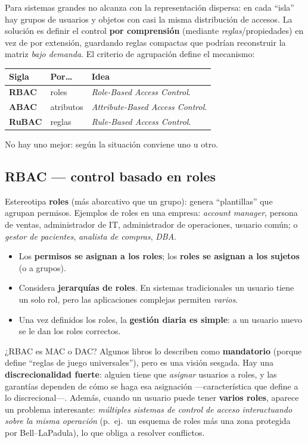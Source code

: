 \documentclass[11pt,a4paper]{article}
\begin{document}
Para sistemas grandes no alcanza con la representación dispersa: en cada ``isla'' hay grupos
de usuarios y objetos con casi la misma distribución de accesos. La solución es definir el
control \textbf{por comprensión} (mediante \emph{reglas}/propiedades) en vez de por extensión,
guardando reglas compactas que podrían reconstruir la matriz \emph{bajo demanda}. El criterio
de agrupación define el mecanismo:

\begin{center}
\renewcommand{\arraystretch}{1.3}
\begin{tabular}{>{\bfseries}p{2.6cm} p{2.8cm} p{7.4cm}}
\toprule
Sigla & Por\dots & Idea \\
\midrule
RBAC & roles & \emph{Role-Based Access Control}.\\
ABAC & atributos & \emph{Attribute-Based Access Control}.\\
RuBAC & reglas & \emph{Rule-Based Access Control}.\\
\bottomrule
\end{tabular}
\end{center}

\noindent No hay uno mejor: según la situación conviene uno u otro.

\subsection{RBAC — control basado en roles}
Estereotipa \textbf{roles} (más abarcativo que un grupo): genera ``plantillas'' que agrupan
permisos. Ejemplos de roles en una empresa: \emph{account manager}, persona de ventas,
administrador de IT, administrador de operaciones, usuario común; o
\emph{gestor de pacientes}, \emph{analista de compras}, \emph{DBA}.
\begin{itemize}[leftmargin=1.4em,itemsep=1pt]
  \item Los \textbf{permisos se asignan a los roles}; los \textbf{roles se asignan a los
        sujetos} (o a grupos).
  \item Considera \textbf{jerarquías de roles}. En sistemas tradicionales un usuario tiene un
        solo rol, pero las aplicaciones complejas permiten \emph{varios}.
  \item Una vez definidos los roles, la \textbf{gestión diaria es simple}: a un usuario nuevo
        se le dan los roles correctos.
\end{itemize}

\begin{anecbox}{¿RBAC es MAC o DAC?}
Algunos libros lo describen como \textbf{mandatorio} (porque define ``reglas de juego
universales''), pero es una visión sesgada. Hay una \textbf{discrecionalidad fuerte}: alguien
tiene que \emph{asignar} usuarios a roles, y las garantías dependen de cómo se haga esa
asignación —característica que define a lo discrecional—. Además, cuando un usuario puede tener
\textbf{varios roles}, aparece un problema interesante: \emph{múltiples sistemas de control de
acceso interactuando sobre la misma operación} (p.\ ej.\ un esquema de roles más una zona
protegida por Bell--LaPadula), lo que obliga a resolver conflictos.
\end{anecbox}
\end{document}
